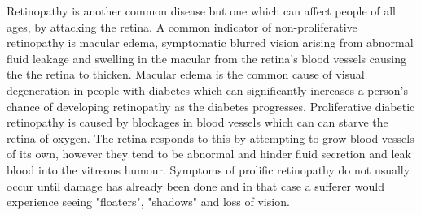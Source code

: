 Retinopathy is another common disease but one which can affect people of
all ages, by attacking the retina. A common indicator of non-proliferative
retinopathy is macular edema, symptomatic blurred vision arising from
abnormal fluid leakage and swelling in the macular from the retina's
blood vessels causing the the retina to thicken.\cite{hee1995quantitative}
Macular edema is the common cause of visual degeneration in people with
diabetes which can significantly increases a person's chance of developing
retinopathy as the diabetes progresses.\cite{klein1984wisconsin} Proliferative
diabetic retinopathy is caused by blockages in blood vessels which can can
starve the retina of oxygen. The retina responds to this by attempting to
grow blood vessels of its own, however they tend to be abnormal and hinder
fluid secretion and leak blood into the vitreous humour. Symptoms of
prolific retinopathy do not usually occur until damage has already been
done and in that case a sufferer would experience seeing "floaters",
"shadows" and loss of vision.


